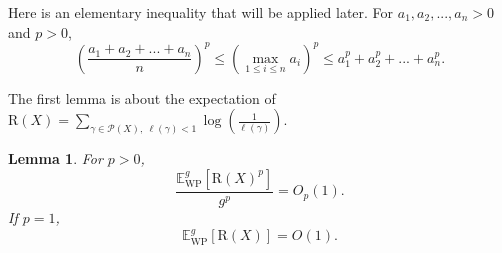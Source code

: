\documentclass[UTF8]{amsart}
\newtheorem{lemma}[theorem]{Lemma}
\numberwithin{equation}{section}
\theoremstyle{definition}
\theoremstyle{example}
\theoremstyle{remark}
\begin{document}
Here is an elementary inequality that will be applied later. 
For $a_1, a_2, ..., a_n >0$ and $p>0$, 
\begin{equation}
	\left( \frac{a_1+a_2+...+a_n}{n} \right)^p \le \left( \max_{1 \le i \le n} a_i \right)^p \le a_1^p+a_2^p + ...+ a_n^p.	
	\label{for:sum_an}
\end{equation}

The first lemma is about the expectation of $\mathrm{R}(X) = \sum\limits_{\gamma \in \mathcal{P}(X), \ \ell(\gamma) <1} \log \left(\frac{1}{\ell(\gamma)}\right)$. 
 \begin{lemma}
	For $p>0$, 	
	\[
	\frac{\mathbb{E}_{\mathrm{WP}}^{g}[\mathrm{R}(X)^p]}{g^p} =  O_p(1). 
	\]
    If $p=1$,	\[
	\mathbb{E}_{\mathrm{WP}}^{g}[\mathrm{R}(X)] = O(1). 
	\]
	\label{lem:r_exp}
\end{lemma}
\end{document}
